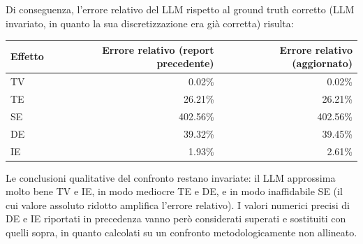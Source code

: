 Di conseguenza, l'errore relativo del LLM rispetto al ground truth corretto (LLM invariato, in quanto la sua discretizzazione era gi\`a corretta) risulta:

\begin{center}
\begin{tabular}{lrr}
\toprule
Effetto & Errore relativo (report precedente) & Errore relativo (aggiornato) \\
\midrule
TV & 0.02\% & 0.02\% \\
TE & 26.21\% & 26.21\% \\
SE & 402.56\% & 402.56\% \\
DE & 39.32\% & 39.45\% \\
IE & 1.93\% & 2.61\% \\
\bottomrule
\end{tabular}
\end{center}

Le conclusioni qualitative del confronto restano invariate: il LLM approssima molto bene TV e IE, in modo mediocre TE e DE, e in modo inaffidabile SE (il cui valore assoluto ridotto amplifica l'errore relativo). I valori numerici precisi di DE e IE riportati in precedenza vanno per\`o considerati superati e sostituiti con quelli sopra, in quanto calcolati su un confronto metodologicamente non allineato.
